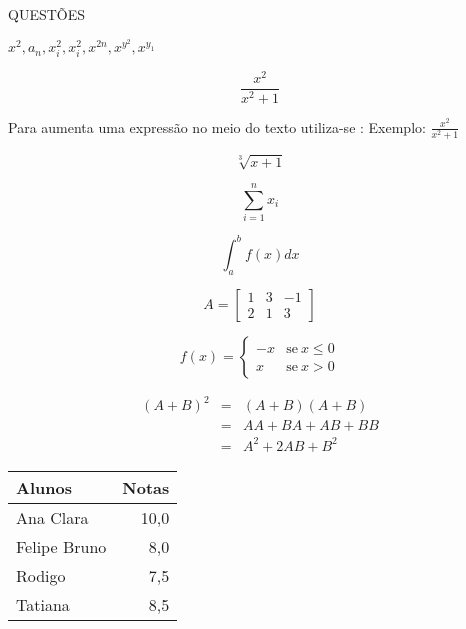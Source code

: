 \documentclass[12pt,a4paper]{article}
\begin{document}
\begin{center} QUESTÕES \end{center}
 $x^2, a_n, x_i^2, x^2_i, x^{2n}, x^{y^2}, x^{y_1}$

 $$\frac{x^2}{x^2 + 1}$$

 Para aumenta uma expressão no meio do texto utiliza-se :
\displaystyle Exemplo: $\displaystyle \frac{x^2}{x^2 + 1}$

 $$\sqrt[3]{x + 1}$$

 $$\sum_{i=1}^{n} x_i$$

 $$\int_a^b f(x) dx$$

 $$A=\left[\begin{array}{ccc}
1&3&-1\\
2&1&3
\end{array} \right]$$

$$f(x) = \left\{\begin{array}{rc}
-x &\mbox{se} \: x \le 0\\
x &\mbox{se} \: x > 0
\end{array} \right. $$

\begin{eqnarray}
(A+B)^2 &=& (A+B)(A+B) \nonumber \\
&=& AA + BA + AB + BB \nonumber \\
&=& A^2 + 2 AB + B^2
\end{eqnarray}

\begin{center} \begin{tabular} {||l|r||}
\hline \hline
{\bf Alunos}&{\bf Notas} \\
\hline
Ana Clara & 10,0 \\
\hline
Felipe Bruno & 8,0 \\
\hline
Rodigo & 7,5 \\
\hline
Tatiana & 8,5 \\
\hline \hline
\end{tabular} \end{center}
\end{document}
